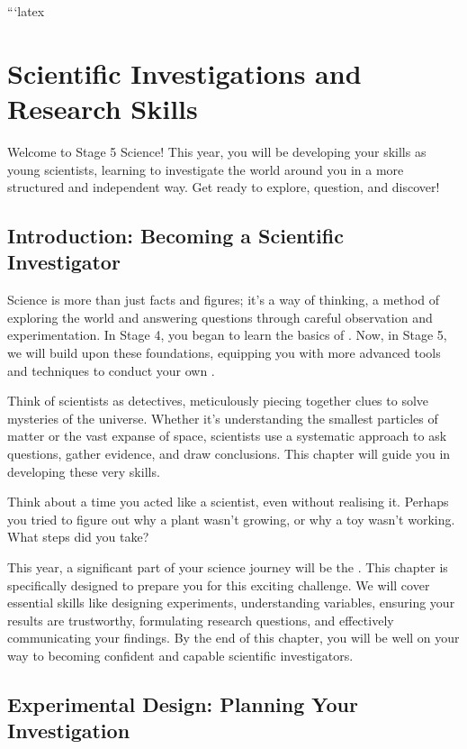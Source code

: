 ```latex
\chapter{Scientific Investigations and Research Skills}

 Welcome to Stage 5 Science! This year, you will be developing your skills as young scientists, learning to investigate the world around you in a more structured and independent way. Get ready to explore, question, and discover!

\section{Introduction: Becoming a Scientific Investigator}

Science is more than just facts and figures; it's a way of thinking, a method of exploring the world and answering questions through careful observation and experimentation.  In Stage 4, you began to learn the basics of . Now, in Stage 5, we will build upon these foundations, equipping you with more advanced tools and techniques to conduct your own .

Think of scientists as detectives, meticulously piecing together clues to solve mysteries of the universe.  Whether it’s understanding the smallest particles of matter or the vast expanse of space, scientists use a systematic approach to ask questions, gather evidence, and draw conclusions. This chapter will guide you in developing these very skills.

\begin{stopandthink}
Think about a time you acted like a scientist, even without realising it. Perhaps you tried to figure out why a plant wasn't growing, or why a toy wasn't working. What steps did you take?
\end{stopandthink}

This year, a significant part of your science journey will be the . This chapter is specifically designed to prepare you for this exciting challenge.  We will cover essential skills like designing experiments, understanding variables, ensuring your results are trustworthy, formulating research questions, and effectively communicating your findings.  By the end of this chapter, you will be well on your way to becoming confident and capable scientific investigators.

\section{Experimental Design: Planning Your Investigation}

